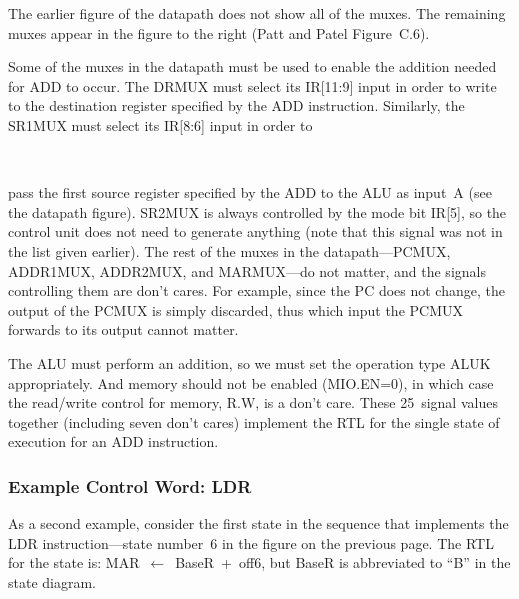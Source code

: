\begin{minipage}{1.8in}
The earlier figure of the datapath does not 
show all of the muxes.  The remaining muxes appear in the figure 
to the right (Patt and Patel Figure~C.6).\mpline

Some of the muxes in the datapath must be used to enable the
addition needed for ADD to occur.  The\linebreak
DRMUX must select its IR[11:9] 
input in order to write to the destination register specified by the 
ADD instruction.  Similarly, the SR1MUX must select its IR[8:6] input 
in order to\linebreak
\end{minipage}\hspace{0.25in}%
\begin{minipage}{4.45in}
\\
\end{minipage}\mpdone

pass the first source register specified by the ADD to the ALU as input~A
(see the datapath figure).  SR2MUX is always controlled by the 
mode bit IR[5], so the control unit does not need to generate anything
(note that this signal was not in the list given earlier).
%
The rest of the muxes in the datapath---PCMUX, ADDR1MUX, ADDR2MUX, and
MARMUX---do not matter, and the signals controlling them are don't cares.
For example, since the PC does not change, the output of the PCMUX
is simply discarded, thus which input the PCMUX forwards to its output
cannot matter.

The ALU must perform an addition, so we must set the operation type
ALUK appropriately.  And memory should not be enabled (MIO.EN=0),
in which case the read/write control for memory, R.W, is a don't
care.  These 25~signal values together (including seven don't cares)
implement the RTL for the single state of execution for an 
ADD instruction.\\


\subsubsection{Example Control Word: LDR}

As a second example, consider the first state in the sequence that 
implements the LDR instruction---state number~6 in the figure on the 
previous page.
%
The RTL for the state is: MAR~$\leftarrow$~BaseR~+~off6, but BaseR is
abbreviated to ``B'' in the state diagram.

